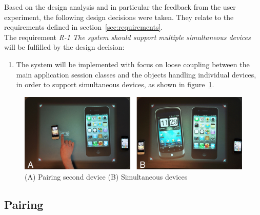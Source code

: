 Based on the design analysis and in particular the feedback from the user experiment, the following design decisions were taken.
They relate to the requirements defined in section~\ref{sec:requirements}.
\\
\linebreak
The requirement \emph{R-1 The system should support multiple simultaneous devices} will be fulfilled by the design decision:
\begin{enumerate}[{D}-1]
\item The system will be implemented with focus on loose coupling between the main application session classes and the objects handling individual devices, in order to support simultaneous devices, as shown in figure~\ref{fig:sq2phones}. 
\end{enumerate}
\begin{figure}[htb]
  \centering
    \includegraphics[width=0.7\linewidth]{images/sq2phones}
  \caption{(A) Pairing second device (B) Simultaneous devices}
  \label{fig:sq2phones}
\end{figure}

\subsection{Pairing}

